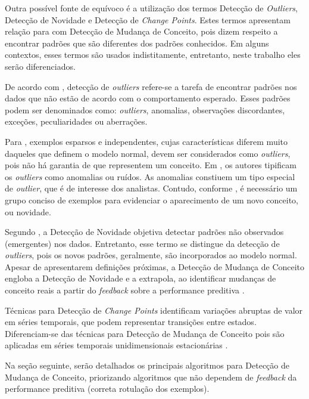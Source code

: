 \documentclass[qual, classic, a4paper]{ufbathesis}
\begin{document}
Outra possível fonte de equívoco é a utilização dos termos Detecção de \textit{Outliers}, Detecção de Novidade e Detecção de \textit{Change Points}.
Estes termos apresentam relação para com Detecção de Mudança de Conceito, pois dizem respeito a encontrar padrões que são diferentes dos padrões conhecidos.
Em alguns contextos, esses termos são usados indistitamente, entretanto, neste trabalho eles serão diferenciados.

De acordo com \cite{Chandola:2009:ADS:1541880.1541882}, 
detecção de \textit{outliers} refere-se a tarefa de encontrar padrões nos dados que não estão de acordo com o comportamento esperado.
Esses padrões podem ser denominados como: \textit{outliers}, anomalias, observações discordantes, exceções, peculiaridades ou aberrações.

Para \cite{Gama:2010:KDD:1855075}, exemplos esparsos e independentes, cujas características diferem muito daqueles que definem o modelo normal, 
devem ser considerados como \textit{outliers}, pois não há garantia de que representem um conceito. 
Em \cite{Aggarwal:2003:FCE:1315451.1315460}, os autores tipificam os \textit{outliers} como anomalias ou ruídos.
As anomalias constiuem um tipo especial de \textit{outlier}, que é de interesse dos analistas.
Contudo, conforme \cite{Gama:2010:KDD:1855075}, é necessário um grupo conciso de exemplos para evidenciar o aparecimento de um novo conceito, ou novidade.

Segundo \cite{Chandola:2009:ADS:1541880.1541882}, a Detecção de Novidade objetiva detectar padrões não observados (emergentes) nos dados.
Entretanto, esse termo se distingue da detecção de \textit{outliers}, pois os novos padrões, geralmente, são incorporados ao modelo normal.
Apesar de apresentarem definições próximas, a Detecção de Mudança de Conceito engloba a Detecção de Novidade e a extrapola, ao identificar 
mudanças de conceito reais a partir do \textit{feedback} sobre a performance preditiva \cite{Gama:2010:KDD:1855075}.

Técnicas para Detecção de \textit{Change Points} identificam variações abruptas de valor em séries temporais, que podem representar transições entre estados.
Diferenciam-se das técnicas para Detecção de Mudança de Conceito pois são aplicadas em séries temporais unidimensionais estacionárias \cite{Aminikhanghahi:2017:SMT:3086013.3086037}.

Na seção seguinte, serão detalhados os principais algoritmos para Detecção de Mudança de Conceito, 
priorizando algoritmos que não dependem de \textit{feedback} da performance preditiva (correta rotulação dos exemplos).
\end{document}
